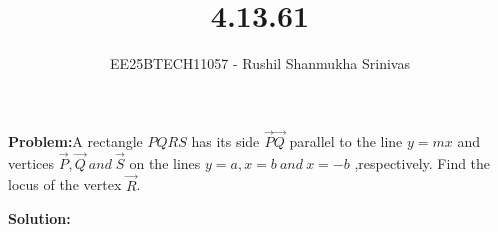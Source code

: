 \documentclass[journal]{IEEEtran}
\begin{document}




\title{4.13.61}
\author{EE25BTECH11057 - Rushil Shanmukha Srinivas
}
{\let\newpage\relax\maketitle}

\renewcommand{\thefigure}{\theenumi}
\renewcommand{\thetable}{\theenumi}
\setlength{\intextsep}{10pt} %

\renewcommand{\thetable}{\theenumi}

\textbf{Problem:}A rectangle $PQRS$ has its side $\vec{P}\vec{Q}$ parallel to the line $y = mx$ and vertices $\vec{P}, \vec{Q} \ and \ \vec{S}$ on the lines $y = a, x = b \ and \ x = -b $ ,respectively. Find the locus of the vertex $\vec{R}$.

\textbf{Solution:}
\end{document}

